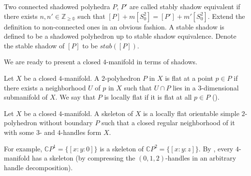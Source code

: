 \begin{definition}\label{def/stable-shadow}
  Two connected shadowed polyhedra $P$, $P'$ are called stably
  shadow equivalent if there exists
  $n, n' \in \mathbb{Z_{\geq 0}}$ such that
  $[P] + m[S^{2}_{0}] = [P'] + m'[S^{2}_{0}]$. Extend the
  definition to non-connected ones in an obvious fashion. A
  stable shadow is defined to be a shadowed polyhedron up to
  stable shadow equivalence. Denote the stable shadow of $[P]$ to
  be $stab([P])$.
\end{definition}

\noindent We are ready to present a closed $4$-manifold in terms
of shadows.

\begin{definition}\label{def/locally-flat-2-polyhedron-in-a-4-manifold}
  Let $X$ be a closed $4$-manifold. A $2$-polyhedron $P$ in $X$
  is flat at a point $p \in P$ if there exists a neighborhood $U$
  of $p$ in $X$ such that $U \cap P$ lies in a $3$-dimensional
  submanifold of $X$. We say that $P$ is locally flat if it is
  flat at all $p \in P$ (\cite[p.394]{turaev-qiok-3-manifolds}).
\end{definition}

\begin{definition}\label{def/skeleton-of-a-4-manifold}
  Let $X$ be a closed $4$-manifold. A skeleton
  \cite[p.395]{turaev-qiok-3-manifolds} of $X$ is a locally flat
  orientable simple $2$-polyhedron without boundary $P$ such that
  a closed regular neighborhood of it with some $3$- and
  $4$-handles form $X$.
\end{definition}

\noindent For example, $\mathbb{C}P^{1} = \{[x:y:0]\}$ is a
skeleton of $\mathbb{C}P^{2} = \{[x:y:z]\}$. By \cite[theorem
IX.1.5]{turaev-qiok-3-manifolds}, every $4$-manifold has a
skeleton (by compressing the $(0,1,2)$-handles in an arbitrary
handle decomposition).

